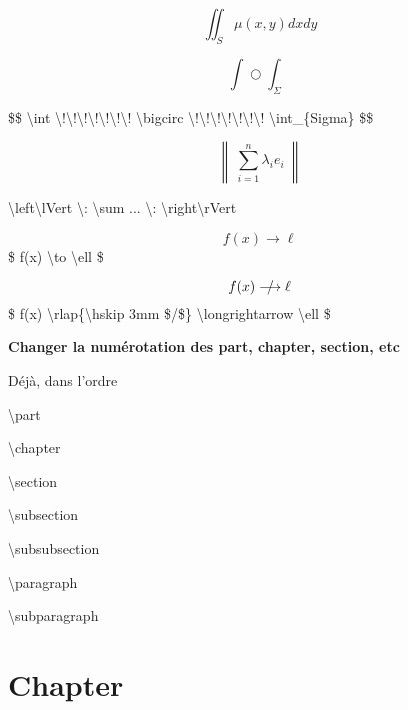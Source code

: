 \documentclass{report}
\begin{document}
\newpage

\begin{center} 

$$ \iint_{S} \mu(x,y) dxdy $$

$$ \int \!\!\!\!\!\! \bigcirc \!\!\!\!\!\! \int_{\Sigma} $$

{\selectfont
\$\$ \textbackslash{}int \textbackslash{}!\textbackslash{}!\textbackslash{}!\textbackslash{}!\textbackslash{}!\textbackslash{}!\textbackslash{}! \textbackslash{}bigcirc \textbackslash{}!\textbackslash{}!\textbackslash{}!\textbackslash{}!\textbackslash{}!\textbackslash{}!\textbackslash{}! \textbackslash{}int\_\{Sigma\} \$\$
}

$$ \left\lVert \: \sum_{i=1}^{n} \lambda_i e_i \: \right\rVert $$ 

{\selectfont
\textbackslash{}left\textbackslash{}lVert \textbackslash{}\!\!\!: \textbackslash{}sum ... \textbackslash{}\!\!\!: \textbackslash{}right\textbackslash{}rVert
}


$$ f(x) \to \ell $$ 
{\selectfont \$ f(x) \textbackslash{}to \textbackslash{}ell \$} 

$$ f(x) \rlap{\hskip 3mm $/$} \longrightarrow \ell $$ 
{\selectfont \$ f(x) \textbackslash{}rlap\{\textbackslash{}hskip 3mm \$/\$\} \textbackslash{}longrightarrow \textbackslash{}ell \$}

\end{center}

\bigskip
\bigskip
\bigskip

\Large \textbf{Changer la numérotation des part, chapter, section, etc}

\normalsize

Déjà, dans l'ordre

{\selectfont 

\textbackslash{}part

\textbackslash{}chapter

\textbackslash{}section

\textbackslash{}subsection

\textbackslash{}subsubsection

\textbackslash{}paragraph

\textbackslash{}subparagraph

} 

\chapter{Chapter}
\end{document}
